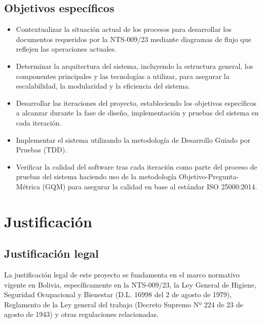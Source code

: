 \subsection{Objetivos específicos}
\begin{itemize}
	\item Contextualizar la situación actual de los procesos para desarrollar los documentos requeridos por la NTS-009/23 mediante diagramas de flujo que reflejen las operaciones actuales.
	\item Determinar la arquitectura del sistema, incluyendo la estructura general, los componentes principales y las tecnologías a utilizar, para asegurar la escalabilidad, la modularidad y la eficiencia del sistema.
	\item Desarrollar las iteraciones del proyecto, estableciendo los objetivos específicos a alcanzar durante la fase de diseño, implementación y pruebas del sistema en cada iteración.
	\item Implementar el sistema utilizando la metodología de Desarrollo Guiado por Pruebas (TDD).
	\item Verificar la calidad del software tras cada iteración como parte del proceso de pruebas del sistema haciendo uso de la metodología Objetivo-Pregunta-Métrica (GQM) para asegurar la calidad en base al estándar ISO 25000:2014.
\end{itemize}

\section{Justificación}
\subsection{Justificación legal}
La justificación legal de este proyecto se fundamenta en el marco normativo vigente en Bolivia, específicamente en la NTS-009/23, la Ley General de Higiene, Seguridad Ocupacional y Bienestar (D.L. 16998 del 2 de agosto de 1979), Reglamento de la Ley general del trabajo (Decreto Supremo Nº 224 de 23 de agosto de 1943) y otras regulaciones relacionadas.

